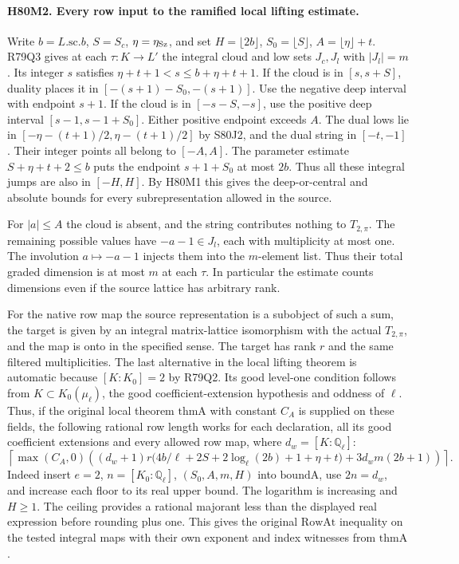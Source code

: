 \paragraph{H80M2. Every row input to the ramified local lifting estimate.}
Write $b=L.\mathrm{sc}.b$, $S=S_c$, $\eta=\eta_{\rm Sz}$, and set
$H=\lfloor2b\rfloor$, $S_0=\lfloor S\rfloor$,
$A=\lfloor\eta\rfloor+t$. R79Q3 gives at each $\tau:K\to L'$
the integral cloud and low sets $J_c,J_l$ with $|J_l|=m$.
Its integer $s$ satisfies $\eta+t+1<s\le b+\eta+t+1$.
If the cloud is in $[s,s+S]$, duality places it in
$[-(s+1)-S_0,-(s+1)]$. Use the negative deep interval with
endpoint $s+1$. If the cloud is in $[-s-S,-s]$, use the positive
deep interval $[s-1,s-1+S_0]$. Either positive endpoint exceeds
$A$. The dual lows lie in
$[-\eta-(t+1)/2,\eta-(t+1)/2]$ by S80J2, and the dual string
in $[-t,-1]$. Their integer points all belong to $[-A,A]$.
The parameter estimate $S+\eta+t+2\le b$ puts the endpoint
$s+1+S_0$ at most $2b$. Thus all these integral jumps are also
in $[-H,H]$. By H80M1 this gives the deep-or-central and absolute
bounds for every subrepresentation allowed in the source.

For $|a|\le A$ the cloud is absent, and the string contributes
nothing to $T_{2,\pi}$. The remaining possible values have
$-a-1\in J_l$, each with multiplicity at most one. The involution
$a\mapsto-a-1$ injects them into the $m$-element list. Thus their
total graded dimension is at most $m$ at each $\tau$. In particular
the estimate counts dimensions even if the source lattice has
arbitrary rank.

For the native row map the source representation is a subobject of
such a sum, the target is given by an integral matrix-lattice
isomorphism with the actual $T_{2,\pi}$, and the map is onto in
the specified sense. The target has rank $r$ and the same filtered
multiplicities. The last alternative in the local lifting theorem is
automatic because $[K:K_0]=2$ by R79Q2. Its good level-one
condition follows from $K\subset K_0(\mu_\ell)$, the good
coefficient-extension hypothesis and oddness of $\ell$.
Thus, if the original local theorem $\mathrm{thmA}$ with constant
$C_A$ is supplied on these fields, the following rational row
length works for each declaration, all its good coefficient extensions
and every allowed row map, where $d_w=[K:\mathbb Q_\ell]$:
\[
 \left\lceil\max(C_A,0)
      \left((d_w+1)r\bigl(4b/\ell+2S+2\log_\ell(2b)+1+\eta+t\bigr)
                   +3d_wm(2b+1)\right)\right\rceil .
\]
Indeed insert $e=2$, $n=[K_0:\mathbb Q_\ell]$,
$(S_0,A,m,H)$ into $\mathrm{boundA}$, use $2n=d_w$, and increase
each floor to its real upper bound. The logarithm is increasing and
$H\ge1$. The ceiling provides a rational majorant less than the
displayed real expression before rounding plus one. This gives the
original $\mathrm{RowAt}$ inequality on the tested integral maps
with their own exponent and index witnesses from $\mathrm{thmA}$.

